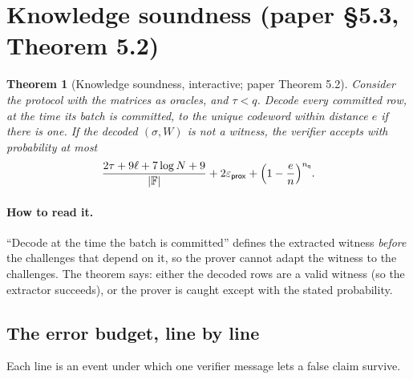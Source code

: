 \documentclass[11pt,a4paper]{article}
\newcommand{\F}{\mathbb{F}}
\newcommand{\epsprox}{\varepsilon_{\mathsf{prox}}}
\newcommand{\nq}{n_{\mathsf{q}}}
\theoremstyle{definition}
\theoremstyle{plain}
\newtheorem{theorem}[definition]{Theorem}
\begin{document}
\section{Knowledge soundness (paper \S5.3, Theorem 5.2)}
\label{sec:sound}

\begin{theorem}[Knowledge soundness, interactive; paper Theorem 5.2]
Consider the protocol with the matrices as oracles, and $\tau<q$. Decode every committed row, at the
time its batch is committed, to the unique codeword within distance $e$ if there is one. If the decoded
$(\sigma,W)$ is not a witness, the verifier accepts with probability at most
\[
  \frac{2\tau+9\ell+7\log N+9}{|\F|}+2\epsprox+\Bigl(1-\frac en\Bigr)^{\nq}.
\]
\end{theorem}

\paragraph{How to read it.} ``Decode at the time the batch is committed'' defines the extracted witness
\emph{before} the challenges that depend on it, so the prover cannot adapt the witness to the challenges.
The theorem says: either the decoded rows are a valid witness (so the extractor succeeds), or the
prover is caught except with the stated probability.

\subsection{The error budget, line by line}

Each line is an event under which one verifier message lets a false claim survive.
\end{document}
